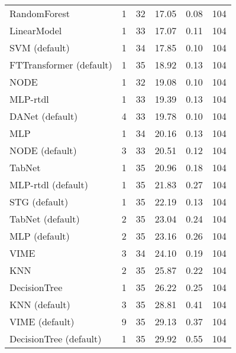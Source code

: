 \begin{tabular}{lrrrrr}
RandomForest            &                  1 &  32 &  17.05 &                           0.08 &   104 \\
LinearModel             &                  1 &  33 &  17.07 &                           0.11 &   104 \\
SVM (default)           &                  1 &  34 &  17.85 &                           0.10 &   104 \\
FTTransformer (default) &                  1 &  35 &  18.92 &                           0.13 &   104 \\
NODE                    &                  1 &  32 &  19.08 &                           0.10 &   104 \\
MLP-rtdl                &                  1 &  33 &  19.39 &                           0.13 &   104 \\
DANet (default)         &                  4 &  33 &  19.78 &                           0.10 &   104 \\
MLP                     &                  1 &  34 &  20.16 &                           0.13 &   104 \\
NODE (default)          &                  3 &  33 &  20.51 &                           0.12 &   104 \\
TabNet                  &                  1 &  35 &  20.96 &                           0.18 &   104 \\
MLP-rtdl (default)      &                  1 &  35 &  21.83 &                           0.27 &   104 \\
STG (default)           &                  1 &  35 &  22.19 &                           0.13 &   104 \\
TabNet (default)        &                  2 &  35 &  23.04 &                           0.24 &   104 \\
MLP (default)           &                  2 &  35 &  23.16 &                           0.26 &   104 \\
VIME                    &                  3 &  34 &  24.10 &                           0.19 &   104 \\
KNN                     &                  2 &  35 &  25.87 &                           0.22 &   104 \\
DecisionTree            &                  1 &  35 &  26.22 &                           0.25 &   104 \\
KNN (default)           &                  3 &  35 &  28.81 &                           0.41 &   104 \\
VIME (default)          &                  9 &  35 &  29.13 &                           0.37 &   104 \\
DecisionTree (default)  &                  1 &  35 &  29.92 &                           0.55 &   104 \\
\bottomrule
\end{tabular}
